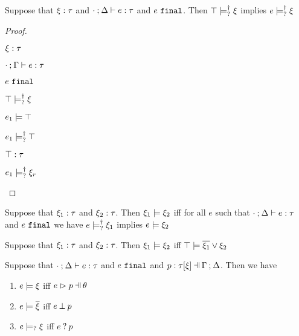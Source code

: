 \begin{corol}
  \label{corol:nn-exhaust}
  Suppose that $\xi : \tau$ and $\cdot \mathbin{;} \Delta \vdash e : \tau$ and $e ~\mathtt{final}$. Then $\top \models_{?}^{\dag} \xi$ implies $e \models_{?}^{\dag} \xi$
\end{corol}
\begin{proof}
  \begin{pfsteps*}
  \item $\xi : \tau$  
  \item $\cdot \mathbin{;} \Gamma \vdash e : \tau$  
  \item $e ~\mathtt{final}$  
  \item $\top \models_{?}^{\dag} \xi$  
  \item $e_1 \models \top$  
  \item $e_1 \models_{?}^{\dag} \top$  
  \item $\top : \tau$  
  \item $e_1 \models_{?}^{\dag} \xi_r$ 
  \end{pfsteps*}
  \resetpfcounter
\end{proof}

\begin{defn}
  \label{defn:const-entailment}
  Suppose that $\xi_1 : \tau$ and $\xi_2 : \tau$.
  Then $\xi_1 \models \xi_2$ iff for all $e$ such that $\cdot \mathbin{;} \Delta \vdash e : \tau$ and $e ~\mathtt{final}$ we have $e \models_{?}^{\dag} \xi_1$ implies $e \models \xi_2$
\end{defn}
\begin{corol}
  \label{lem:material-entailment}
  Suppose that $\xi_1 : \tau$ and $\xi_2 : \tau$. Then $\xi_1 \models \xi_2$ iff $\top \models \overline{\xi_1} \vee \xi_2$
\end{corol}

\begin{lem}
  \label{lem:const-matching-coherence}
  Suppose that $\cdot \mathbin{;} \Delta \vdash e : \tau$ and $e ~\mathtt{final}$ and $\chpattyp{p}{\tau}{\xi}{\Gamma}{\Delta}$. Then we have
  \begin{enumerate}
    \item $e \models \xi$ iff $\hpatmatch{e}{p}{\theta}$
    \item $e \models \overline{\xi}$ iff $e \mathbin{\bot} p$
    \item $e \models_{?} \xi$ iff $e \mathbin{?} p$
  \end{enumerate}
\end{lem}

